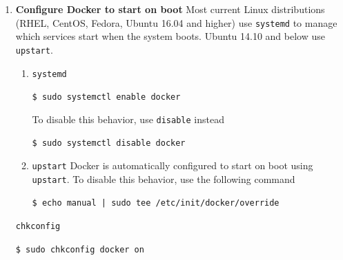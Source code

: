 \begin{enumerate}
	\item
	\textbf{Configure Docker to start on boot}\newline
Most current Linux distributions (RHEL, CentOS, Fedora, Ubuntu 16.04 and higher) use \verb=systemd=
to manage which services start when the system boots. Ubuntu 14.10 and below use \verb=upstart=.
	\begin{enumerate}
	\item \verb=systemd= \newline\begin{center}\verb=$ sudo systemctl enable docker=\end{center}
		To disable this behavior, use \verb=disable= instead\newline
		\begin{center}\verb=$ sudo systemctl disable docker=\end{center}
	\item \verb=upstart= \newline
		Docker is automatically configured to start on boot using \verb=upstart=. 
		To disable this behavior, use the following command \newline
		\begin{center}\verb=$ echo manual | sudo tee /etc/init/docker/override=\end{center}
	\end{enumerate}
	\verb=chkconfig=
	\begin{center}\verb=$ sudo chkconfig docker on=\end{center}
\end{enumerate}

